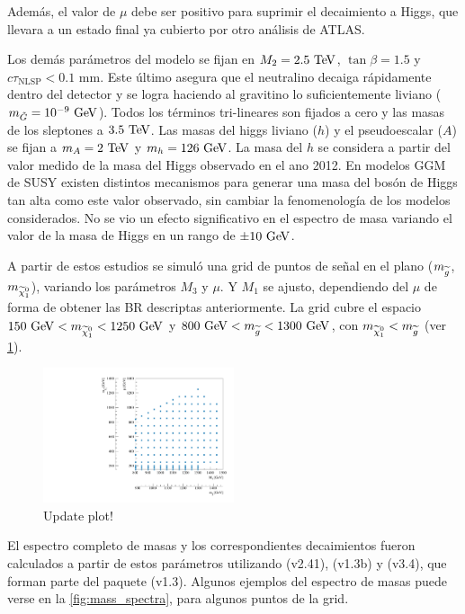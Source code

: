 Además, el valor de $\mu$ debe ser positivo para
suprimir el decaimiento a Higgs, que llevara a un estado final ya cubierto por
otro análisis de ATLAS.

Los demás parámetros del modelo se fijan en $M_2=2.5\tev$, $\tan\beta=1.5$ y
$c\tau_{\mathrm{NLSP}} < 0.1$ mm. Este último asegura que el neutralino decaiga
rápidamente dentro del detector y se logra haciendo al gravitino lo
suficientemente liviano ($m_{\tilde{G}}=10^{-9} \gev$). Todos los términos
tri-lineares son fijados a cero y las masas de los sleptones a $3.5 \tev$.
Las masas del higgs liviano ($h$) y el pseudoescalar ($A$) se fijan a
$m_{A} = 2 \tev$ y $m_{h} = 126 \gev$.
La masa del $h$ se considera a partir del valor
medido de la masa del Higgs observado en el ano 2012.
En modelos GGM de SUSY existen distintos
mecanismos\cite{Craig:2011yk,Auzzi:2011eu,Csaki:2012fh,Larsen:2012rq,Craig:2012hc}
para generar una masa del bosón de Higgs tan alta como este valor observado, sin
cambiar la fenomenología de los modelos considerados. No se vio un efecto
significativo en el espectro de masa variando el valor de la masa de Higgs en un
rango de $\pm 10 \gev$.

A partir de estos estudios se simuló una grid de puntos de señal en el plano
($m_{\widetilde{g}}$, $m_{\ninoone}$), variando los parámetros $M_3$ y $\mu$. Y $M_1$
se ajusto, dependiendo del $\mu$ de forma de obtener las BR descriptas
anteriormente. La grid cubre el espacio $150\gev < m_{\ninoone} < 1250 \gev$ y
$800\gev < m_{\gluino} < 1300 \gev$, con $m_{\ninoone} < m_{\gluino}$ (ver
\cref{fig:gridpoints}).


\begin{figure}[!htbp]
  \centering
  \includegraphics[width=0.5\textwidth]{figures/run1_grid}
  \caption{Update plot!}
  \label{fig:gridpoints}
\end{figure}


El espectro completo de masas y los correspondientes decaimientos fueron
calculados a partir de estos parámetros utilizando {\suspect}
(v2.41)\cite{Djouadi2007426}, {\sdecay} (v1.3b)\cite{Muhlleitner:2004mka} y
{\hdecay} (v3.4)\cite{Djouadi:1997yw}, que forman parte del paquete {\susyhit}
(v1.3)\cite{Djouadi:2006bz}. Algunos ejemplos del espectro de masas puede verse
en la \cref{fig:mass_spectra}, para algunos puntos de la grid.

